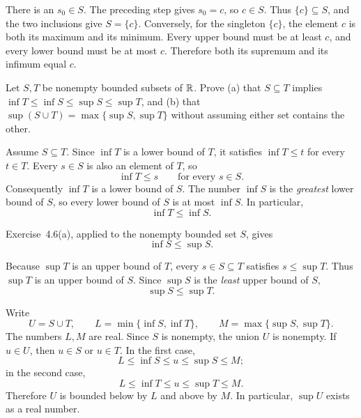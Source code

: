 There is an $s_0\in S$. The preceding step gives $s_0=c$, so $c\in S$.
Thus $\{c\}\subseteq S$, and the two inclusions give $S=\{c\}$.
Conversely, for the singleton $\{c\}$, the element $c$ is both its
maximum and its minimum. Every upper bound must be at least $c$, and
every lower bound must be at most $c$. Therefore both its supremum
and its infimum equal $c$.



\goal Let $S,T$ be nonempty bounded subsets of $\mathbb{R}$. Prove (a) that
$S\subseteq T$ implies
$\inf T\le\inf S\le\sup S\le\sup T$, and (b) that
$\sup(S\cup T)=\max\{\sup S,\sup T\}$ without assuming either set
contains the other.

Assume $S\subseteq T$. Since $\inf T$ is a lower bound of $T$, it
satisfies $\inf T\le t$ for every $t\in T$. Every $s\in S$ is also
an element of $T$, so
\[
 \inf T\le s\qquad\text{for every }s\in S.
\]
Consequently $\inf T$ is a lower bound of $S$. The number $\inf S$
is the \emph{greatest} lower bound of $S$, so every lower bound of
$S$ is at most $\inf S$. In particular,
\[
 \inf T\le\inf S.
\]

Exercise~4.6(a), applied to the nonempty bounded set $S$, gives
\[
 \inf S\le\sup S.
\]

Because $\sup T$ is an upper bound of $T$, every $s\in S\subseteq T$
satisfies $s\le\sup T$. Thus $\sup T$ is an upper bound of $S$.
Since $\sup S$ is the \emph{least} upper bound of $S$,
\[
 \sup S\le\sup T.
\]


Write
\[
 U=S\cup T,\qquad
 L=\min\{\inf S,\inf T\},\qquad
 M=\max\{\sup S,\sup T\}.
\]
The numbers $L,M$ are real. Since $S$ is nonempty, the union $U$ is
nonempty. If $u\in U$, then $u\in S$ or $u\in T$.
In the first case,
\[
 L\le\inf S\le u\le\sup S\le M;
\]
in the second case,
\[
 L\le\inf T\le u\le\sup T\le M.
\]
Therefore $U$ is bounded below by $L$ and above by $M$. In particular,
$\sup U$ exists as a real number.

